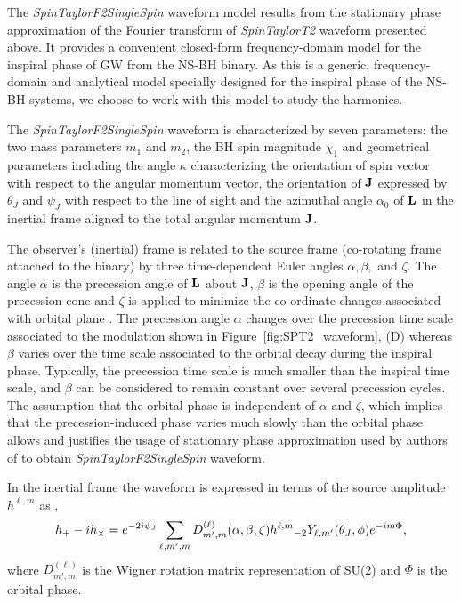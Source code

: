 \documentclass[preprint,onecolumn,,tightenlines,superscriptaddress,showpacs,nofootinbib,eqsecnum,amsfonts,amsmath]{revtex4}
\begin{document}
The \textit{SpinTaylorF2SingleSpin} waveform model \cite{AS2014} results from
the stationary phase approximation of the Fourier transform of
\textit{SpinTaylorT2} waveform \cite{SPT21,SPT2} presented above. It provides a
convenient closed-form frequency-domain model for the inspiral phase of GW from
the NS-BH binary. As this is a generic, frequency-domain and analytical model
specially designed for the inspiral phase of the NS-BH systems, we choose to
work with this model to study the harmonics.

The {\it SpinTaylorF2SingleSpin} waveform is characterized by seven parameters:
the two mass parameters $m_1$ and $m_2$, the BH spin magnitude $\chi_1$ and
geometrical parameters including the angle $\kappa$ characterizing the
orientation of spin vector with respect to the angular momentum vector, the
orientation of $\bf J$ expressed by $\theta_J$ and $\psi_J$ with respect to the
line of sight and the azimuthal angle $\alpha_0$ of $\bf L$ in the inertial
frame aligned to the total angular momentum $\bf J$.

The observer's (inertial) frame is related to the source frame (co-rotating
frame attached to the binary) by three time-dependent Euler angles $\alpha,
\beta,$ and $\zeta$. The angle $\alpha$ is the precession angle of ${\bf L}$
about ${\bf J}$, $\beta$ is the opening angle of the precession cone and $\zeta$
is applied to minimize the co-ordinate changes associated with orbital plane
\cite{ACS1994}. The precession angle $\alpha$ changes over the precession time
scale associated to the modulation shown in Figure~\ref{fig:SPT2_waveform}, (D)
whereas $\beta$ varies over the time scale associated to the orbital decay
during the inspiral phase. Typically, the precession time scale is much smaller
than the inspiral time scale, and $\beta$ can be considered to remain constant
over several precession cycles. The assumption that the orbital phase is 
independent of $\alpha$ and $\zeta$, which implies that the precession-induced
phase varies much slowly than the orbital phase allows and justifies
the usage of stationary phase approximation used by authors of \cite{AS2014} to
obtain {\it SpinTaylorF2SingleSpin} waveform.

In the inertial frame the waveform is expressed in terms of the source amplitude $h^{\ell,m}$ as \cite{AS2014},
\begin{equation}
\label{h}
h_+ - i h_\times =e^{-2i \psi_J} \displaystyle \sum_{\ell,m',m} D_{m', m}^{(\ell)}(\alpha, \beta, \zeta) h^{\ell, m} \mathstrut_{-2} Y_{\ell, m'}(\theta_J,\phi) e^{-i m \Phi},
\end{equation}
where $D^{(\ell)}_{m', m}$ is the Wigner rotation matrix representation of SU(2) and $\Phi$ is the orbital phase. 
\end{document}
